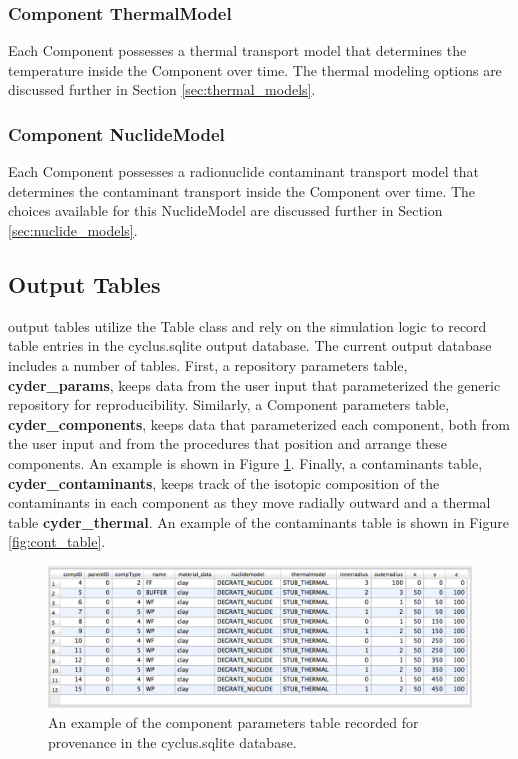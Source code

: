 \subsubsection{Component ThermalModel}

Each Component possesses a thermal transport model that determines the 
temperature inside the Component over time. The thermal modeling options are 
discussed further in Section \ref{sec:thermal_models}.  

\subsubsection{Component NuclideModel}

Each Component possesses a radionuclide contaminant transport model that 
determines the contaminant transport inside the Component over time. The 
choices available for this NuclideModel are discussed further in Section 
\ref{sec:nuclide_models}. 


\subsection{Output Tables}

\Cyder output tables utilize the \Cyclus Table class and rely on the \Cyclus 
simulation logic to record table entries in the cyclus.sqlite output database. 
The current \Cyder output database includes a number of tables. First, a repository 
parameters table, \textbf{cyder\_params}, keeps data from the user input that 
parameterized the generic repository for reproducibility. Similarly, a 
Component parameters table, \textbf{cyder\_components}, keeps data that 
parameterized each component, both from the user input and from the \Cyder 
procedures that position and arrange these components. An example is shown in 
Figure \ref{fig:comp_table}. Finally, a contaminants table, 
\textbf{cyder\_contaminants}, keeps track of the isotopic composition of the 
contaminants in each component as they move radially outward and a thermal 
table \textbf{cyder\_thermal}. An example of the contaminants table is shown in 
Figure \ref{fig:cont_table}. 

  \begin{figure}[htbp!]
    \begin{center}
      \includegraphics[width=\textwidth]{./chapters/paradigm/comp_table.eps}
      \caption[An example \Cyder output table of component parameters.]{An example of the \Cyder component parameters table recorded for provenance in the cyclus.sqlite database.}
      \label{fig:comp_table}
    \end{center}
  \end{figure}

